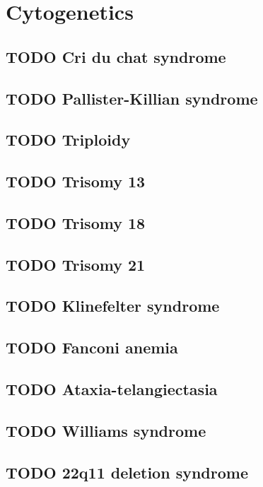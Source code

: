 \documentclass{scrartcl}
\begin{document}
\section{Cytogenetics}
\label{sec:orgcc743d4}
\subsection{{\bfseries\sffamily TODO} Cri du chat syndrome}
\label{sec:org34ad5ba}
\subsection{{\bfseries\sffamily TODO} Pallister-Killian syndrome}
\label{sec:orgb56719d}
\subsection{{\bfseries\sffamily TODO} Triploidy}
\label{sec:orge87b290}
\subsection{{\bfseries\sffamily TODO} Trisomy 13}
\label{sec:org7c13401}
\subsection{{\bfseries\sffamily TODO} Trisomy 18}
\label{sec:orgc64a84b}
\subsection{{\bfseries\sffamily TODO} Trisomy 21}
\label{sec:org0f73f43}
\subsection{{\bfseries\sffamily TODO} Klinefelter syndrome}
\label{sec:org5fd341f}
\subsection{{\bfseries\sffamily TODO} Fanconi anemia}
\label{sec:orgf98c5b2}
\subsection{{\bfseries\sffamily TODO} Ataxia-telangiectasia}
\label{sec:orgcc76d88}
\subsection{{\bfseries\sffamily TODO} Williams syndrome}
\label{sec:orgaf3c42e}
\subsection{{\bfseries\sffamily TODO} 22q11 deletion syndrome}
\label{sec:org2907742}
\end{document}
